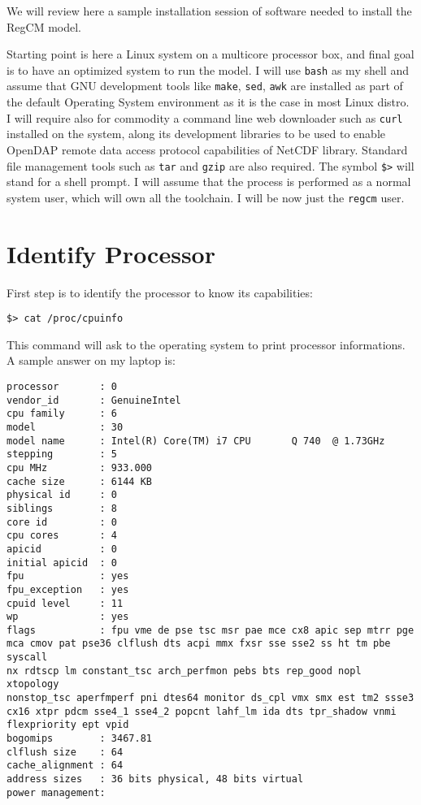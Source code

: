 %
%

We will review here a sample installation session of software needed to
install the RegCM model.

Starting point is here a Linux system on a multicore processor box, and final
goal is to have an optimized system to run the model.
I will use \verb=bash= as my shell and assume that GNU development tools like
\verb=make=, \verb=sed=, \verb=awk= are installed as part of the default
Operating System environment as it is the case in most Linux distro.
I will require also for commodity a command line web downloader such as
\verb=curl= installed on the system, along its development libraries to be
used to enable OpenDAP remote data access protocol capabilities of NetCDF
library. Standard file management tools such as \verb=tar= and \verb=gzip=
are also required.
The symbol \verb=$>= will stand for a shell prompt.
I will assume that the process is performed as a normal system user, which
will own all the toolchain. I will be now just the \verb=regcm= user.

\section{Identify Processor}

First step is to identify the processor to know its capabilities:

\begin{Verbatim}
$> cat /proc/cpuinfo
\end{Verbatim}

This command will ask to the operating system to print processor informations.
A sample answer on my laptop is:

\begin{Verbatim}
processor       : 0
vendor_id       : GenuineIntel
cpu family      : 6
model           : 30
model name      : Intel(R) Core(TM) i7 CPU       Q 740  @ 1.73GHz
stepping        : 5
cpu MHz         : 933.000
cache size      : 6144 KB
physical id     : 0
siblings        : 8
core id         : 0
cpu cores       : 4
apicid          : 0
initial apicid  : 0
fpu             : yes
fpu_exception   : yes
cpuid level     : 11
wp              : yes
flags           : fpu vme de pse tsc msr pae mce cx8 apic sep mtrr pge
mca cmov pat pse36 clflush dts acpi mmx fxsr sse sse2 ss ht tm pbe syscall
nx rdtscp lm constant_tsc arch_perfmon pebs bts rep_good nopl xtopology
nonstop_tsc aperfmperf pni dtes64 monitor ds_cpl vmx smx est tm2 ssse3
cx16 xtpr pdcm sse4_1 sse4_2 popcnt lahf_lm ida dts tpr_shadow vnmi
flexpriority ept vpid
bogomips        : 3467.81                                                       
clflush size    : 64                                                            
cache_alignment : 64                                                            
address sizes   : 36 bits physical, 48 bits virtual                             
power management:
\end{Verbatim}

